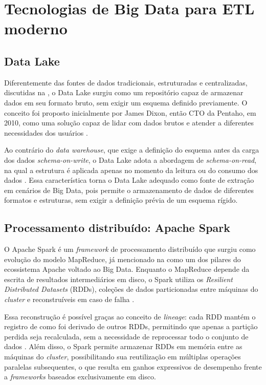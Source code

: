\section{Tecnologias de Big Data para ETL moderno}

\subsection{Data Lake}

Diferentemente das fontes de dados tradicionais, estruturadas e centralizadas, discutidas
na , o Data Lake surgiu como um repositório capaz de armazenar 
dados em seu formato bruto, sem exigir um esquema definido previamente. O conceito foi proposto 
inicialmente por James Dixon, então CTO da Pentaho, em 2010, como uma solução capaz de lidar com 
dados brutos e atender a diferentes necessidades dos usuários \cite{hai2023datalakes}.

Ao contrário do \textit{data warehouse}, que exige a definição do esquema antes da
carga dos dados \textit{schema-on-write}, o Data Lake adota a abordagem de
\textit{schema-on-read}, na qual a estrutura é aplicada apenas no momento da leitura ou
do consumo dos dados \cite{hai2023datalakes}. Essa característica torna o Data Lake adequado 
como fonte de extração em cenários de Big Data, pois permite o armazenamento de dados de 
diferentes formatos e estruturas, sem exigir a definição prévia de um esquema rígido.

\subsection{Processamento distribuído: Apache Spark}

O Apache Spark é um \textit{framework} de processamento distribuído que surgiu como
evolução do modelo MapReduce, já mencionado na 
como um dos pilares do ecossistema Apache voltado ao Big Data. Enquanto o MapReduce 
depende da escrita de resultados intermediários em disco, o Spark utiliza os 
\textit{Resilient Distributed Datasets} (RDDs), coleções de dados particionadas 
entre máquinas do \textit{cluster} e reconstruíveis em caso de falha \cite{zaharia2010spark}.

Essa reconstrução é possível graças ao conceito de \textit{lineage}: cada RDD mantém
o registro de como foi derivado de outros RDDs, permitindo que apenas a partição perdida
seja recalculada, sem a necessidade de reprocessar todo o conjunto de dados
\cite{zaharia2010spark}. Além disso, o Spark permite armazenar RDDs em memória entre
as máquinas do \textit{cluster}, possibilitando sua reutilização em múltiplas operações
paralelas subsequentes, o que resulta em ganhos expressivos de desempenho frente a
\textit{frameworks} baseados exclusivamente em disco. 

